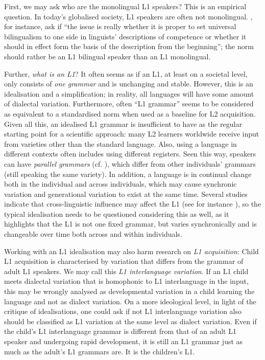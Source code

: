 \documentclass[output=paper,colorlinks,citecolor=brown,modfonts,nonflat]{../langscibook}
\begin{document}
First, we may ask who are the monolingual L1 speakers? This is an empirical question. In today’s globalised society, L1 speakers are often not monolingual. \citet[6]{CookNewson2007}, for instance, ask if “the issue is really whether it is proper to set universal bilingualism to one side in linguists’ descriptions of competence or whether it should in effect form the basis of the description from the beginning”; the norm should rather be an L1 bilingual speaker than an L1 monolingual.

Further, \textit{what is an L1}? It often seems as if an L1, at least on a societal level, only consists of \textit{one grammar} and is unchanging and stable. However, this is an idealisation and a simplification; in reality, all languages will have some amount of dialectal variation. Furthermore, often ``L1 grammar'' seems to be considered as equivalent to a standardised norm when used as a baseline for L2 acquisition. Given all this, an idealised L1 grammar is insufficient to have as the regular starting point for a scientific approach: many L2 learners worldwide receive input from varieties other than the standard language. Also, using a language in different contexts often includes using different registers. Seen this way, speakers can have \textit{parallel grammars} (cf. \citealt{EideSollid2011}), which differ from other individuals’ grammars (still speaking the same variety). In addition, a language is in continual change both in the individual and across individuals, which may cause synchronic variation and generational variation to exist at the same time. Several studies indicate that cross-linguistic influence may affect the L1 (see for instance \citealt{CookNewson2007}), so the typical idealisation needs to be questioned considering this as well, as it highlights that the L1 is not one fixed grammar, but varies synchronically and is changeable over time both across and within individuals.

Working with an L1 idealisation may also harm research on \textit{L1 acquisition}: Child L1 acquisition is characterised by variation that differs from the grammar of adult L1 speakers. We may call this \textit{L1 interlanguage variation}. If an L1 child meets dialectal variation that is homophonic to L1 interlanguage in the input, this may be wrongly analysed as developmental variation in a child learning the language and not as dialect variation. On a more ideological level, in light of the critique of idealisations, one could ask if not L1 interlanguage variation also should be classified as L1 variation at the same level as dialect variation. Even if the child’s L1 interlanguage grammar is different from that of an adult L1 speaker and undergoing rapid development, it is still an L1 grammar just as much as the adult’s L1 grammars are. It is the children’s L1.
\end{document}
